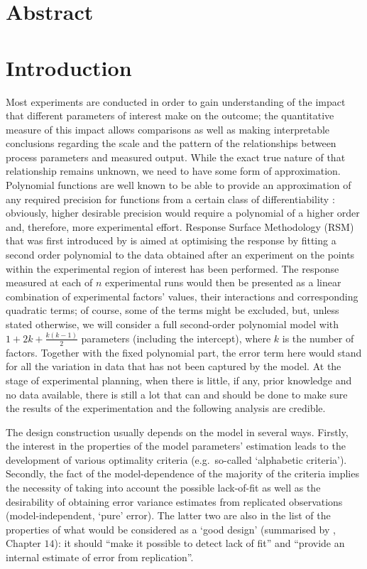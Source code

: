 \documentclass[11pt]{article}
\begin{document}
\section{Abstract}

\section{Introduction}

Most experiments are conducted in order to gain understanding of the impact that different parameters of interest make on the outcome; the quantitative measure of this impact allows comparisons as well as making interpretable conclusions regarding the scale and the pattern of the relationships between process parameters and measured output. 
While the exact true nature of that relationship remains unknown, we need to have some form of approximation. Polynomial functions are well known to be able to provide an approximation of any required precision for functions from a certain class of differentiability \citep{Rudin1987real}: obviously, higher desirable precision would require a polynomial of a higher order and, therefore, more experimental effort. Response Surface Methodology (RSM) that was first introduced by \cite{Box1951Roy} is aimed at optimising the response by fitting a second order polynomial to the data obtained after an experiment on the points within the experimental region of interest has been performed. The response measured at each of $n$ experimental runs would then be presented as a linear combination of experimental factors' values, their interactions and corresponding quadratic terms; of course, some of the terms might be excluded, but, unless stated otherwise, we will consider a full second-order polynomial model with $1+2k+\frac{k(k-1)}{2}$ parameters (including the intercept), where $k$ is the number of factors. Together with the fixed polynomial part, the error term here would stand for all the variation in data that has not been captured by the model. 
At the stage of experimental planning, when there is little, if any, prior knowledge and no data available, there is still a lot that can and should be done to make sure the results of the experimentation and the following analysis are credible.

The design construction usually depends on the model in several ways. Firstly, the interest in the properties of the model parameters' estimation leads to the development of various optimality criteria (e.g.~so-called `alphabetic criteria'). Secondly, the fact of the model-dependence of the majority of the criteria implies the necessity of taking into account the possible lack-of-fit as well as the desirability of obtaining error variance estimates from replicated observations (model-independent, `pure' error). The latter two are also in the list of the properties of what would be considered as a `good design' (summarised by \cite{Box1987empirical}, Chapter $14$): it should ``make it possible to detect lack of fit'' and ``provide an internal estimate of error from replication''.
\end{document}
